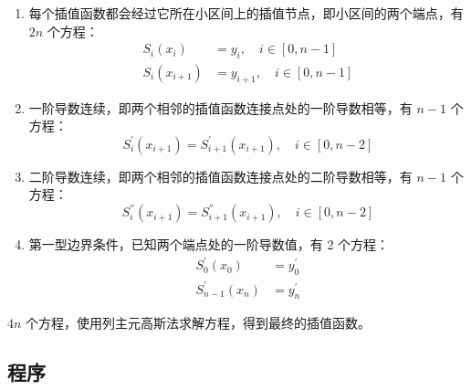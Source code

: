 \begin{enumerate}[(1)]
    \item 每个插值函数都会经过它所在小区间上的插值节点，即小区间的两个端点，有 $2n$ 个方程：
    \begin{align}
        S_i(x_i) &= y_i, \quad i \in [0,n-1] \\
        S_i(x_{i+1}) &= y_{i+1}, \quad i \in [0,n-1]
    \end{align}

    \item 一阶导数连续，即两个相邻的插值函数连接点处的一阶导数相等，有 $n-1$ 个方程：
    \begin{equation}
        S_i^{'}(x_{i+1}) = S_{i+1}^{'}(x_{i+1}), \quad i \in [0,n-2]
    \end{equation}

    \item 二阶导数连续，即两个相邻的插值函数连接点处的二阶导数相等，有 $n-1$ 个方程：
    \begin{equation}
        S_i^{''}(x_{i+1}) = S_{i+1}^{''}(x_{i+1}), \quad i \in [0,n-2]
    \end{equation}
    
    \item 第一型边界条件，已知两个端点处的一阶导数值，有 2 个方程：
    \begin{align}
        S_0^{'}(x_0) &= y_0^{'} \\
        S_{n-1}^{'}(x_n) &= y_n^{'}
    \end{align}
\end{enumerate}

$4n$ 个方程，使用列主元高斯法求解方程，得到最终的插值函数。

\subsection{程序}


